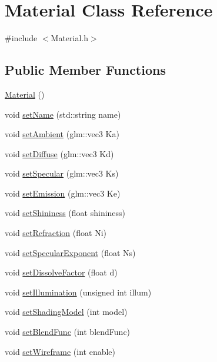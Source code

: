 \hypertarget{class_material}{}\section{Material Class Reference}
\label{class_material}


{\ttfamily \#include $<$Material.\+h$>$}

\subsection*{Public Member Functions}
\begin{DoxyCompactItemize}
\item 
\hyperlink{class_material_a137e987401b63eb7c6c27c3e38bc74b5}{Material} ()
\item 
void \hyperlink{class_material_a8d3228e94c92ffffc1c5a9504ee5fd90}{set\+Name} (std\+::string name)
\item 
void \hyperlink{class_material_ad166d6c2ae9bc2ae460f5912ef913914}{set\+Ambient} (glm\+::vec3 Ka)
\item 
void \hyperlink{class_material_a4cb374db09a8167ebf36ab17fd373fe3}{set\+Diffuse} (glm\+::vec3 Kd)
\item 
void \hyperlink{class_material_af55a5fefcf54ddac103e254298381c42}{set\+Specular} (glm\+::vec3 Ks)
\item 
void \hyperlink{class_material_a82a92812bac1ee728bd11816cb3217f5}{set\+Emission} (glm\+::vec3 Ke)
\item 
void \hyperlink{class_material_a329d0ae8403956a71b1d45b3284f7dd7}{set\+Shininess} (float shininess)
\item 
void \hyperlink{class_material_aa7eeda191689ff20ec61750440c39427}{set\+Refraction} (float Ni)
\item 
void \hyperlink{class_material_a76c5ad9250191eed374fb6d896efd0bb}{set\+Specular\+Exponent} (float Ns)
\item 
void \hyperlink{class_material_a5974bc8810af827031f0697d21418c3a}{set\+Dissolve\+Factor} (float d)
\item 
void \hyperlink{class_material_ae5fc41aae479cbae2b85c9f581759767}{set\+Illumination} (unsigned int illum)
\item 
void \hyperlink{class_material_a6b219cb34ef48da8feb6c03459a5c30d}{set\+Shading\+Model} (int model)
\item 
void \hyperlink{class_material_a3e20f3c7602300c54b2e8b5ee1c73c42}{set\+Blend\+Func} (int blend\+Func)
\item 
void \hyperlink{class_material_ab7326632dff9200c9e4e2c9aa98fed60}{set\+Wireframe} (int enable)

\end{DoxyCompactItemize}
